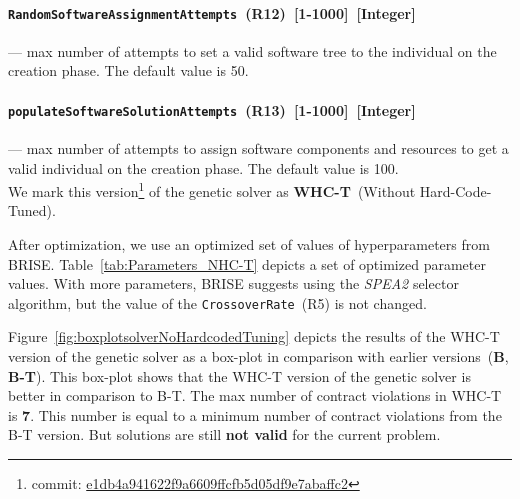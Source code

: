 \paragraph{\texttt{RandomSoftwareAssignmentAttempts}~(R12)~[1-1000]~[Integer]} — max number of attempts to set a valid software tree to the individual on the creation phase. The default value is 50.
\paragraph{\texttt{populateSoftwareSolutionAttempts}~(R13)~[1-1000]~[Integer]} —  max number of attempts to assign software components and resources to get a valid individual on the creation phase. The default value is 100.\\

We mark this version\footnote{commit: \href{https://git-st.inf.tu-dresden.de/mquat/mquat2/commit/e1db4a941622f9a6609ffcfb5d05df9e7abaffc2}{e1db4a941622f9a6609ffcfb5d05df9e7abaffc2}} of the genetic solver as \textbf{WHC-T}~(Without Hard-Code-Tuned).

After optimization, we use an optimized set of values of hyperparameters from BRISE. Table~\ref{tab:Parameters_NHC-T} depicts a set of optimized parameter values. With more parameters, BRISE suggests using the \textit{SPEA2} selector algorithm, but the value of the \texttt{CrossoverRate}~(R5) is not changed.

\begin{table}
	\centering
	\caption{Optimized parameters of WHC-T version of the genetic solver}\label{tab:Parameters_NHC-T}
\end{table}

Figure~\ref{fig:boxplotsolverNoHardcodedTuning} depicts the results of the WHC-T version of the genetic solver as a box-plot in comparison with earlier versions~(\textbf{B}, \textbf{B-T}). This box-plot shows that the WHC-T version of the genetic solver is better in comparison to B-T. The max number of contract violations in WHC-T is \textbf{7}. This number is equal to a minimum number of contract violations from the B-T version. But solutions are still \textbf{not valid} for the current problem. 

